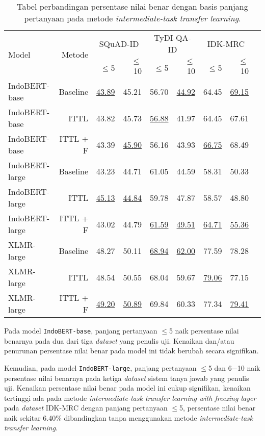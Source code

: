 \begin{table}[H]\centering
\begin{tabular}{lrrrrrrrr}\toprule
\multirow{2}{*}{Model} &\multirow{2}{*}{Metode} &\multicolumn{2}{c}{SQuAD-ID} &\multicolumn{2}{c}{TyDI-QA-ID} &\multicolumn{2}{c}{IDK-MRC} \\\cmidrule{3-8}
& &$\leq$5 &$\leq$10 &$\leq$5 &$\leq$10 &$\leq$5 &$\leq$10 \\\midrule
IndoBERT-base &Baseline &\underline{43.89} &45.21 &56.70 &\underline{44.92} &64.45 &\underline{69.15} \\
IndoBERT-base &ITTL &43.82 &45.73 &\underline{56.88} &41.97 &64.45 &67.61 \\
IndoBERT-base &ITTL + F &43.39 &\underline{45.90} &56.16 &43.93 &\underline{66.75} &68.49 \\
\hline
IndoBERT-large &Baseline &43.23 &44.71 &61.05 &44.59 &58.31 &50.33 \\
IndoBERT-large &ITTL &\underline{45.13} &\underline{44.84} &59.78 &47.87 &58.57 &48.80 \\
IndoBERT-large &ITTL + F &43.02 &44.79 &\underline{61.59} &\underline{49.51} &\underline{64.71} &\underline{55.36} \\
\hline
XLMR-large &Baseline &48.27 &50.11 &\underline{68.94} &\underline{62.00} &77.59 &78.28 \\
XLMR-large &ITTL &48.54 &50.55 &68.04 &59.67 &\underline{79.06} &77.15 \\
XLMR-large &ITTL + F &\underline{49.20} &\underline{50.89} &69.84 &60.33 &77.34 &\underline{79.41} \\
\bottomrule
\end{tabular}
\caption{Tabel perbandingan persentase nilai benar dengan basis panjang pertanyaan pada metode \emph{intermediate-task transfer learning}.}
\end{table}

Pada model \texttt{IndoBERT-base}, panjang pertanyaan $\leq$5 naik persentase nilai benarnya pada dua dari tiga \emph{dataset} yang penulis uji. Kenaikan dan/atau penurunan persentase nilai benar pada model ini tidak berubah secara signifikan.

Kemudian, pada model \texttt{IndoBERT-large}, panjang pertanyaan $\leq$5 dan 6$-$10 naik persentase nilai benarnya pada ketiga \emph{dataset} sistem tanya jawab yang penulis uji. Kenaikan persentase nilai benar pada model ini cukup signifikan, kenaikan tertinggi ada pada metode \emph{intermediate-task transfer learning with freezing layer} pada \emph{dataset} IDK-MRC dengan panjang pertanyaan $\leq$5, persentase nilai benar naik sekitar 6.40\% dibandingkan tanpa menggunakan metode \emph{intermediate-task transfer learning}.

